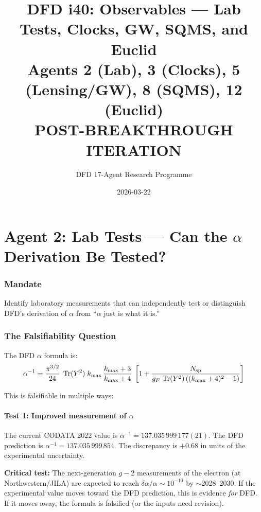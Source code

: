 \documentclass[11pt,a4paper]{article}
\title{DFD i40: Observables --- Lab Tests, Clocks, GW, SQMS, and Euclid\\[6pt]
\large Agents 2 (Lab), 3 (Clocks), 5 (Lensing/GW), 8 (SQMS), 12 (Euclid)\\[6pt]
\normalsize POST-BREAKTHROUGH ITERATION}
\author{DFD 17-Agent Research Programme}
\date{2026-03-22}
\newcommand{\Tr}{\operatorname{Tr}}
\begin{document}
\maketitle
\tableofcontents
\newpage

\part{Agent 2: Lab Tests --- Can the $\alpha$ Derivation Be Tested?}
\label{part:agent2}

\section{Mandate}
Identify laboratory measurements that can independently test or distinguish DFD's derivation of $\alpha$ from ``$\alpha$ just is what it is.''

\section{The Falsifiability Question}

The DFD $\alpha$ formula is:
\begin{equation}
\alpha^{-1} = \frac{\pi^{3/2}}{24}\;\Tr(Y^2)\;k_{\max}\,\frac{k_{\max}+3}{k_{\max}+4}\;\left[1 + \frac{N_{\rm sp}}{g_F\,\Tr(Y^2)\,((k_{\max}+4)^2-1)}\right]
\end{equation}

This is falsifiable in multiple ways:

\subsection{Test 1: Improved measurement of $\alpha$}

The current CODATA 2022 value is $\alpha^{-1} = 137.035\,999\,177(21)$. The DFD prediction is $\alpha^{-1} = 137.035\,999\,854$. The discrepancy is $+0.68$ in units of the experimental uncertainty.

\textbf{Critical test:} The next-generation $g-2$ measurements of the electron (at Northwestern/JILA) are expected to reach $\delta\alpha/\alpha \sim 10^{-10}$ by $\sim$2028--2030. If the experimental value moves toward the DFD prediction, this is evidence \emph{for} DFD. If it moves away, the formula is falsified (or the inputs need revision).
\end{document}
